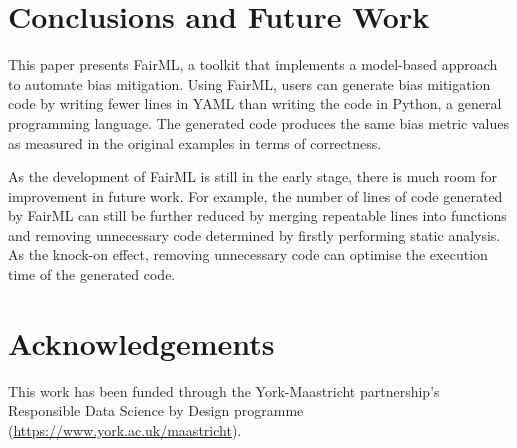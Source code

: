 \documentclass[sigconf,review]{acmart}
\begin{document}
	\section{Conclusions and Future Work}
	\label{sec:conclusions_and_future_work}
	This paper presents FairML, a toolkit that implements a model-based approach to automate bias mitigation. Using FairML, users can generate bias mitigation code by writing fewer lines in YAML than writing the code in Python, a general programming language.
	The generated code produces the same bias metric values as measured in the original examples in terms of correctness.
	
	As the development of FairML is still in the early stage, 
	there is much room for improvement in future work. For example, the number of lines of code generated by FairML can still be further reduced by merging repeatable lines into functions and removing unnecessary code determined by firstly performing static analysis. 
	As the knock-on effect, removing unnecessary code can optimise the execution time of the generated code. 
	
	
	\section{Acknowledgements}
	\label{sec:acknowledgements}
	This work has been funded through the York-Maastricht
	partnership's Responsible Data Science by Design programme
	(\url{https://www.york.ac.uk/maastricht}).
	
	
	 
	
	
\end{document}
